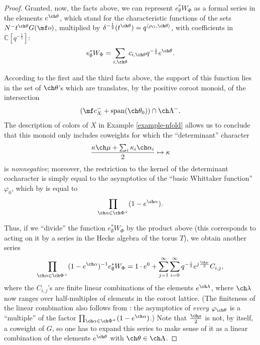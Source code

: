 \begin{proof}
Granted, now, the facts above, we can represent $e_\emptyset^* W_{\Phi}$ as a formal series in the elements $e^{\ch\theta}$, which stand for the characteristic functions of the sets $N^- t^{\ch\theta} G(\mf o)$, multiplied by $\delta^{-\frac{1}{2}}(t^{\ch\theta}) = q^{\left<\rho_G,\ch\theta\right>}$, with coefficients in $\mathbb C[q^{-\frac{1}{2}}]$:
\[ e_\emptyset^* W_{\Phi} = \sum_{i,\ch\theta} c_{i,\ch\theta} q^{-\frac{i}{2}} e^{\ch\theta}.\]

According to the first and the third facts above, the support of this function lies in the set of $\ch\theta$'s which are translates, by the positive coroot monoid, of the intersection
\[ (\mf c_X^- + \text{span}(\ch\theta_0)) \cap \ch\Lambda^-.\]
The description of colors of $X$ in Example \ref{example-nfold} allows us to conclude that this monoid only includes coweights for which the ``determinant'' character
\[\frac{\kappa \ch\mu + \sum_i \kappa_i \ch\alpha_i}{2} \mapsto \kappa\]
is \emph{nonnegative}; moreover, the restriction to the kernel of the determinant
cocharacter is simply equal to the asymptotics of the ``basic Whittaker function'' $\varphi_0$, which by \cite[Theorem 6.8 and Example 6.4]{SaSatake} is equal to
\[\prod_{\ch\alpha \in \ch\Phi^+} (1-e^{\ch\alpha}).\]

Thus, if we ``divide'' the function $e_\emptyset^* W_{\Phi}$ by the product above (this corresponds to acting on it by a series in the Hecke algebra of the torus $T$), we obtain another series
\[\prod_{\ch\alpha \in \ch\Phi^+} (1-e^{\ch\alpha})^{-1} e_\emptyset^* W_{\Phi} =
1\cdot e^0 + \sum_{j=1}^\infty \sum_{i=0}^\infty q^{-\frac{i}{2}} e^{j\frac{\ch\mu}{2}} C_{i,j}
,\]
where the $C_{i,j}$'s are finite linear combinations of the elements $e^{\ch\lambda}$, where $\ch\lambda$ now ranges over half-multiples of elements in the coroot lattice. (The finiteness of the linear combination also follows from \cite[Theorem 6.8 and Example 6.4]{SaSatake}: the asymptotics of \emph{every} $\varphi_{\ch\theta}$ is a ``multiple'' of the factor $\prod_{\ch\alpha \in \ch\Phi^+} (1-e^{\ch\alpha})$.)
Note that $\frac{\ch\mu}{2}$ is not, by itself, a coweight of $G$, so one has to expand this series to make sense of it as a linear combination of the elements $e^{\ch\theta}$ with $\ch\theta \in \ch\Lambda$.


\end{proof}
